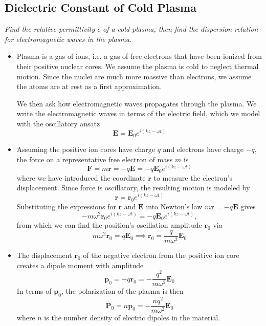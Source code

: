 \documentclass[11pt, a4paper]{article}
\renewcommand{\vec}[1]{\bm{#1}} %
\renewcommand{\r}{\vec{r}}
\newcommand{\E}{\vec{E}}  %
\newcommand{\e}{\epsilon}
\newcommand{\pe}{\vec{p}}  %
\renewcommand{\P}{\vec{P}}  %
\begin{document}
\subsection{Dielectric Constant of Cold Plasma}
\textit{Find the relative permittivity $ \e $ of a cold plasma, then find the dispersion relation for electromagnetic waves in the plasma.}
\begin{itemize}
	\item Plasma is a gas of ions, i.e. a gas of free electrons that have been ionized from their positive nuclear cores. We assume the plasma is cold to neglect thermal motion. Since the nuclei are much more massive than electrons, we assume the atoms are at rest as a first approximation. 
	
	We then ask how electromagnetic waves propagates through the plasma. We write the electromagnetic waves in terms of the electric field, which we model with the oscillatory ansatz
	\begin{equation*}
		\E = \E_{0} e^{i(kz - \omega t)}
	\end{equation*}
	
	\item Assuming the positive ion cores have charge $ q $ and electrons have charge $ -q $, the force on a representative free electron of mass $ m $ is
	\begin{equation*}
		\vec{F}  = m \ddot{\r} = - q \E = - q \E_{0} e^{i(kz - \omega t)}
	\end{equation*}
	where we have introduced the coordinate $ \r $ to measure the electron's displacement. Since force is oscillatory, the resulting motion is modeled by
	\begin{equation*}
		\r = \r_{0}e^{i(kz - \omega t)}
	\end{equation*}
	Substituting the expressions for $ \r $ and $ \E $ into Newton's law $ m \ddot{\r} = - q \E  $ gives
	\begin{equation*}
		- m \omega^{2}\r_{0}e^{i(kz - \omega t)} =  - q \E_{0} e^{i(kz - \omega t)},
	\end{equation*}
	from which we can find the position's oscillation amplitude $ \r_{0} $ via
	\begin{equation*}
		m \omega^{2} \r_{0} = q \E_{0} \implies \r_{0} = \frac{q}{m \omega^{2}}\E_{0}
	\end{equation*}
	
	\item The displacement $ \r_{0} $ of the negative electron from the positive ion core creates a dipole moment with amplitude
	\begin{equation*}
		\pe_{0} = - q \r_{0} = - \frac{q^{2}}{m \omega^{2}} \E_{0}
	\end{equation*}
	In terms of $ \pe_{0} $, the polarization of the plasma is then
	\begin{equation*}
		\P_{0} = n \pe_{0} =  - \frac{nq^{2}}{m \omega^{2}} \E_{0}
	\end{equation*}
	where $ n $ is the number density of electric dipoles in the material. 
	

\end{itemize}
\end{document}
